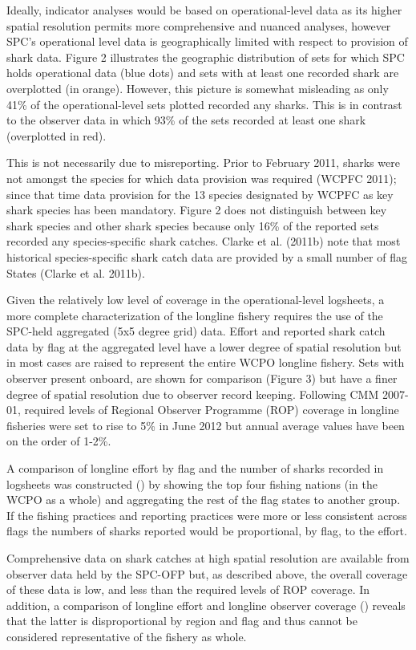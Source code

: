 \documentclass[12pt]{SCreport}
\begin{document}
  
Ideally, indicator analyses would be based on operational-level data as its higher spatial resolution permits more comprehensive and nuanced analyses, however SPC's operational level data is geographically limited with respect to provision of shark data.  Figure 2 illustrates the geographic distribution of sets for which SPC holds operational data (blue dots) and sets with at least one recorded shark are overplotted (in orange). However, this picture is somewhat misleading as only 41\% of the operational-level sets plotted recorded any sharks. This is in contrast to the observer data in which 93\% of the sets recorded at least one shark (overplotted in red).

This is not necessarily due to misreporting. Prior to February 2011, sharks were not amongst the species for which data provision was required (WCPFC 2011); since that time data provision for the 13 species designated by WCPFC as key shark species has been mandatory. Figure 2 does not distinguish between key shark species and other shark species because only 16\% of the reported sets recorded any species-specific shark catches. Clarke et al. (2011b) note that most historical species-specific shark catch data are provided by a small number of flag States (Clarke et al. 2011b).

Given the relatively low level of coverage in the operational-level logsheets, a more complete characterization of the longline fishery requires the use of the SPC-held aggregated (5x5 degree grid) data. Effort and reported shark catch data by flag at the aggregated level have a lower degree of spatial resolution but in most cases are raised to represent the entire WCPO longline fishery. Sets with observer present onboard, are shown for comparison (Figure 3) but have a finer degree of spatial resolution due to observer record keeping. Following CMM 2007-01, required levels of Regional Observer Programme (ROP) coverage in longline fisheries were set to rise to 5\% in June 2012 but annual average values have been on the order of 1-2\%.

A comparison of longline effort by flag and the number of sharks recorded in logsheets was constructed () by showing the top four fishing nations (in the WCPO as a whole) and aggregating the rest of the flag states to another group. If the fishing practices and reporting practices were more or less consistent across flags the numbers of sharks reported would be proportional, by flag, to the effort.

Comprehensive data on shark catches at high spatial resolution are available from observer data held by the SPC-OFP but, as described above, the overall coverage of these data is low, and less than the required levels of ROP coverage. In addition, a comparison of longline effort and longline observer coverage () reveals that the latter is disproportional by region and flag and thus cannot be considered representative of the fishery as whole.
\end{document}
